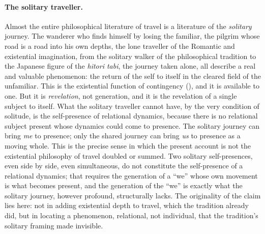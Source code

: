 \paragraph{The solitary traveller.}
Almost the entire philosophical literature of travel is a literature of the \emph{solitary} journey. The wanderer who finds himself by losing the familiar, the pilgrim whose road is a road into his own depths, the lone traveller of the Romantic and existential imagination, from the solitary walker of the philosophical tradition to the Japanese figure of the \emph{hitori tabi}, the journey taken alone, all describe a real and valuable phenomenon: the return of the self to itself in the cleared field of the unfamiliar. This is the existential function of contingency (), and it is available to one. But it is \emph{revelation}, not generation, and it is the revelation of a single subject to itself. What the solitary traveller cannot have, by the very condition of solitude, is the self-presence of relational dynamics, because there is no relational subject present whose dynamics could come to presence. The solitary journey can bring \emph{me} to presence; only the shared journey can bring \emph{us} to presence as a moving whole. This is the precise sense in which the present account is not the existential philosophy of travel doubled or summed. Two solitary self-presences, even side by side, even simultaneous, do not constitute the self-presence of a relational dynamics; that requires the generation of a ``we'' whose own movement is what becomes present, and the generation of the ``we'' is exactly what the solitary journey, however profound, structurally lacks. The originality of the claim lies here: not in adding existential depth to travel, which the tradition already did, but in locating a phenomenon, relational, not individual, that the tradition's solitary framing made invisible.

